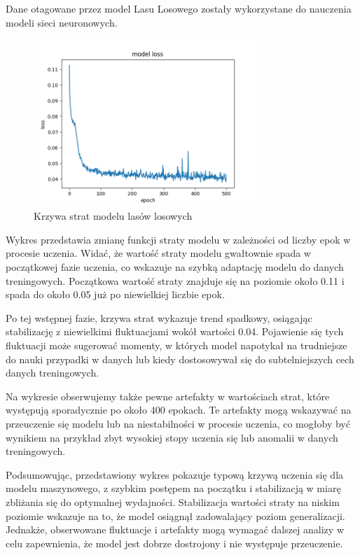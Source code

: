 \documentclass{article}
\begin{document}
Dane otagowane przez model Lasu Losowego zostały wykorzystane do nauczenia modeli sieci neuronowych.

\begin{figure}[H]
    \centering
    \includegraphics[width=0.75\textwidth]{epoch_loss_forest.png}
    \caption{Krzywa strat modelu lasów losowych}
\end{figure}

Wykres przedstawia zmianę funkcji straty modelu w zależności od liczby epok w procesie uczenia. Widać, że wartość straty modelu gwałtownie spada w początkowej fazie uczenia, co wskazuje na szybką adaptację modelu do danych treningowych. Początkowa wartość straty znajduje się na poziomie około 0.11 i spada do około 0.05 już po niewielkiej liczbie epok.

Po tej wstępnej fazie, krzywa strat wykazuje trend spadkowy, osiągając stabilizację z niewielkimi fluktuacjami wokół wartości 0.04. Pojawienie się tych fluktuacji może sugerować momenty, w których model napotykał na trudniejsze do nauki przypadki w danych lub kiedy dostosowywał się do subtelniejszych cech danych treningowych.

Na wykresie obserwujemy także pewne artefakty w wartościach strat, które występują sporadycznie po około 400 epokach. Te artefakty mogą wskazywać na przeuczenie się modelu lub na niestabilności w procesie uczenia, co mogłoby być wynikiem na przykład zbyt wysokiej stopy uczenia się lub anomalii w danych treningowych.

Podsumowując, przedstawiony wykres pokazuje typową krzywą uczenia się dla modelu maszynowego, z szybkim postępem na początku i stabilizacją w miarę zbliżania się do optymalnej wydajności. Stabilizacja wartości straty na niskim poziomie wskazuje na to, że model osiągnął zadowalający poziom generalizacji. Jednakże, obserwowane fluktuacje i artefakty mogą wymagać dalszej analizy w celu zapewnienia, że model jest dobrze dostrojony i nie występuje przeuczenie.
\end{document}
